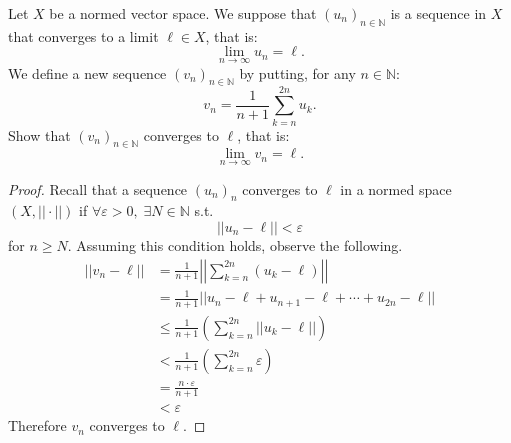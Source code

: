 \begin{prob}
    Let $X$ be a normed vector space. We suppose that 
    $(u_n)_{n\in\mathbb N}$ is a sequence in $X$ that converges 
    to a limit $\ell \in X$, that is: 
    \[
        \lim_{n\to\infty}u_n = \ell.
    \]
    We define a new sequence $(v_n)_{n\in\mathbb N}$ by putting, 
    for any $n \in \mathbb N$:
    \[
        v_n = \frac{1}{n+1}\displaystyle\sum_{k=n}^{2n}u_k.
    \]
    Show that $(v_n)_{n\in\mathbb N}$ converges to $\ell$, that is:
    \[
        \lim_{n\to\infty} v_n = \ell.
    \]
\end{prob}
\begin{proof}
    Recall that a sequence $(u_n)_n$ converges to 
    $\ell$ in a normed space 
    $(X,||\cdot||)$ if $\forall \varepsilon > 0, \; \exists N \in 
    \mathbb N$ s.t. 
    \[
        ||u_n - \ell|| < \varepsilon
    \]
    for $n \geq N$. 
    Assuming this condition holds, observe the following.
    \begin{align*}
        ||v_n - \ell|| 
        &= 
        \frac{1}{n+1}
        \left|\left| 
        \displaystyle\sum_{k=n}^{2n}\left(u_k - \ell \right)
        \right|\right| \\ 
        &= \frac{1}{n+1}||u_n - \ell + u_{n+1} - \ell + 
        \cdots + u_{2n} - \ell||\\
        &\leq 
        \frac{1}{n+1}\left( 
        \displaystyle\sum_{k=n}^{2n}||u_k - \ell||\right) \\ 
        &< \frac{1}{n+1}
        \left(\displaystyle\sum_{k=n}^{2n}\varepsilon\right)\\ 
        &= \frac{n\cdot \varepsilon}{n+1} \\ 
        &< \varepsilon
    \end{align*}
    Therefore $v_n$ converges to $\ell$.
\end{proof}

